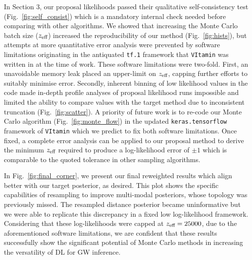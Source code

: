 \documentclass[a4paper]{jpconf}
\begin{document}
In Section 3, our proposal likelihoods passed their qualitative self-consistency test (Fig.~\ref{fig:self_consist}) which is a mandatory internal check needed before comparing with other algorithms. We showed that increasing the Monte Carlo batch size ($z_\textup{eff}$) increased the reproducibility of our method (Fig.~\ref{fig:hists}), but attempts at more quantitative error analysis were prevented by software limitations originating in the antiquated \texttt{tf.1} framework that \texttt{VItamin} was written in at the time of work. These software limitations were two-fold. First, an unavoidable memory leak placed an upper-limit on $z_\textup{eff}$, capping further efforts to suitably minimise error. Secondly, inherent binning of low likelihood values in the code made in-depth profile analyses of proposal likelihood runs impossible and limited the ability to compare values with the target method due to inconsistent truncation (Fig.~\ref{fig:scatter}). A priority of future work is to re-code our Monte Carlo algorithm (Fig.~\ref{fig:monte_flow}) in the updated \texttt{keras.tensorflow} framework of \texttt{VItamin} which we predict to fix both software limitations. Once fixed, a complete error analysis can be applied to our proposal method to derive the minimum $z_\textup{eff}$ required to produce a log-likelihood error of $\pm1$ which is comparable to the quoted tolerance in other sampling algorithms.

In Fig.~\ref{fig:final_corner}, we present our final reweighted results which align better with our target posterior, as desired. This plot shows the specific capabilities of resampling to improve multi-modal posteriors, whose topology was previously missed. The resampled distance posterior became uninformative but we were able to replicate this discrepancy in a fixed low log-likelihood framework. Considering that these log-likelihoods were capped at $z_\textup{eff}=25000$, due to the aforementioned software limitations, we are confident that these results successfully show the significant potential of Monte Carlo methods in increasing the versatility of DL for GW inference.
\end{document}
